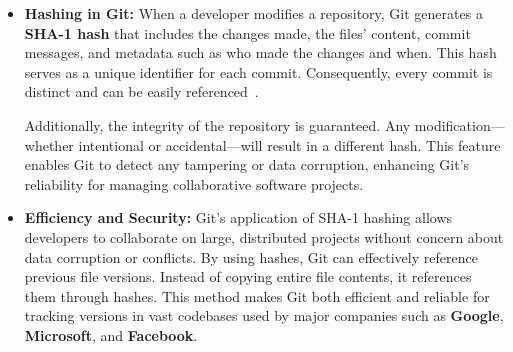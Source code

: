 \documentclass[11pt,a4paper]{article}
\begin{document}
    \begin{itemize}
        \item \textbf{Hashing in Git:}
        \newline
        When a developer modifies a repository, Git generates a \textbf{SHA-1 hash} that includes the changes made, the files' content, commit messages, and metadata such as who made the changes and when. This hash serves as a unique identifier for each commit. Consequently, every commit is distinct and can be easily referenced~\cite{git}.
        \par
        Additionally, the integrity of the repository is guaranteed. Any modification—whether intentional or accidental—will result in a different hash. This feature enables Git to detect any tampering or data corruption, enhancing Git’s reliability for managing collaborative software projects.


        \item \textbf{Efficiency and Security:}
        \newline
        Git’s application of SHA-1 hashing allows developers to collaborate on large, distributed projects without concern about data corruption or conflicts. By using hashes, Git can effectively reference previous file versions. Instead of copying entire file contents, it references them through hashes. This method makes Git both efficient and reliable for tracking versions in vast codebases used by major companies such as \textbf{Google}, \textbf{Microsoft}, and \textbf{Facebook}.

    \end{itemize}
\end{document}
